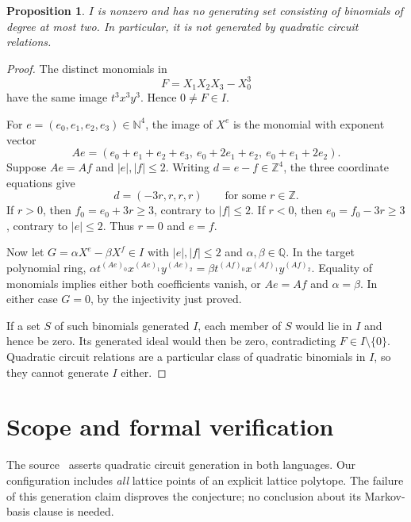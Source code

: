 \documentclass[11pt]{article}
\newtheorem{proposition}{Proposition}
\begin{document}
\begin{proposition}
$I$ is nonzero and has no generating set consisting of binomials of
degree at most two. In particular, it is not generated by quadratic
circuit relations.
\end{proposition}
\begin{proof}
The distinct monomials in
\[
 F=X_1X_2X_3-X_0^3
\]
have the same image $t^3x^3y^3$. Hence $0\ne F\in I$.

For $e=(e_0,e_1,e_2,e_3)\in\mathbb N^4$, the image of $X^e$ is the
monomial with exponent vector
\[
 A e=(e_0+e_1+e_2+e_3,\ e_0+2e_1+e_2,\ e_0+e_1+2e_2).
\]
Suppose $Ae=Af$ and $|e|,|f|\leq2$. Writing $d=e-f\in\mathbb Z^4$,
the three coordinate equations give
\[
 d=(-3r,r,r,r)\qquad\text{for some }r\in\mathbb Z.
\]
If $r>0$, then $f_0=e_0+3r\geq3$, contrary to $|f|\leq2$.
If $r<0$, then $e_0=f_0-3r\geq3$, contrary to $|e|\leq2$.
Thus $r=0$ and $e=f$.

Now let $G=\alpha X^e-\beta X^f\in I$ with $|e|,|f|\leq2$ and
$\alpha,\beta\in\mathbb Q$. In the target polynomial ring,
$\alpha t^{(Ae)_0}x^{(Ae)_1}y^{(Ae)_2}
=\beta t^{(Af)_0}x^{(Af)_1}y^{(Af)_2}$.
Equality of monomials implies either both coefficients vanish, or
$Ae=Af$ and $\alpha=\beta$. In either case $G=0$, by the injectivity
just proved.

If a set $S$ of such binomials generated $I$, each member of $S$
would lie in $I$ and hence be zero. Its generated ideal would then be
zero, contradicting $F\in I\setminus\{0\}$. Quadratic circuit relations
are a particular class of quadratic binomials in $I$, so they cannot
generate $I$ either.
\end{proof}

\section{Scope and formal verification}
The source~\cite{Source} asserts quadratic circuit generation in both
languages. Our configuration includes \emph{all} lattice points of an
explicit lattice polytope. The failure of this generation claim disproves
the conjecture; no conclusion about its Markov-basis clause is needed.
\end{document}
